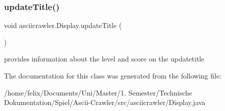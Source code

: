 \subsubsection{\texorpdfstring{update\+Title()}{updateTitle()}}
{\footnotesize\ttfamily void asciicrawler.\+Display.\+update\+Title (\begin{DoxyParamCaption}{ }\end{DoxyParamCaption})\hspace{0.3cm}{\ttfamily [inline]}}

provides information about the level and score on the updatetitle 

The documentation for this class was generated from the following file\+:\begin{DoxyCompactItemize}
\item 
/home/felix/\+Documents/\+Uni/\+Master/1. Semester/\+Technische Dokumentation/\+Spiel/\+Ascii-\/\+Crawler/src/asciicrawler/Display.\+java\end{DoxyCompactItemize}
